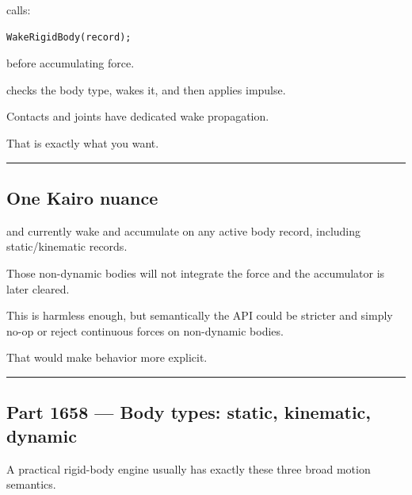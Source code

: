  calls:

\begin{verbatim}
WakeRigidBody(record);
\end{verbatim}

before accumulating force.

 checks the body type, wakes it, and then applies impulse.

Contacts and joints have dedicated wake propagation.

That is exactly what you want.

\begin{center}\rule{0.5\linewidth}{0.5pt}\end{center}

\subsection{One Kairo nuance}\label{06-engine-ii-ch037-one-kairo-nuance}

\hypertarget{06-engine-ii-ch037-one-kairo-nuance}{}

 and  currently wake and accumulate on any active body record, including static/kinematic records.

Those non-dynamic bodies will not integrate the force and the accumulator is later cleared.

This is harmless enough, but semantically the API could be stricter and simply no-op or reject continuous forces on non-dynamic bodies.

That would make behavior more explicit.

\begin{center}\rule{0.5\linewidth}{0.5pt}\end{center}

\subsection{Part 1658 --- Body types: static, kinematic, dynamic}\label{06-engine-ii-ch037-part-1658-body-types-static-kinematic-dynamic}

\hypertarget{06-engine-ii-ch037-part-1658-body-types-static-kinematic-dynamic}{}

A practical rigid-body engine usually has exactly these three broad motion semantics.

